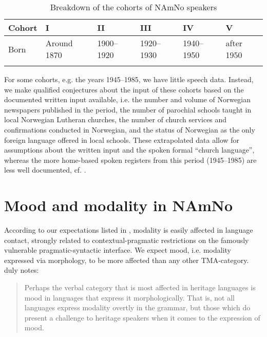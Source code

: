 \documentclass[output=paper]{langscibook}
\begin{document}
\begin{table}[h]
\caption{Breakdown of the cohorts of NAmNo speakers \citep{EideHjelde2023}}
\label{tab:eide:cohorts_short}
\begin{tabularx}{\textwidth}{l *5{Q}}
\lsptoprule
Cohort & I & II & III & IV & V\\\midrule
Born & Around 1870 & 1900--1920 & 1920--1930 & 1940--1950 & after 1950\\
\lspbottomrule
\end{tabularx}
\end{table}


For some cohorts, e.g. the years 1945--1985, we have little speech data. Instead, we make qualified conjectures about the input of these cohorts based on the documented written input available, i.e. the number and volume of Norwegian newspapers published in the period, the number of parochial schools taught in local Norwegian Lutheran churches, the number of church services and confirmations conducted in Norwegian, and the status of Norwegian as the only foreign language offered in local schools. These extrapolated data allow for assumptions about the written input and the spoken formal “church language”, whereas the more home-based spoken registers from this period (1945--1985) are less well documented, cf. \citet{EideHjelde2023}.  

\section{Mood and modality in NAmNo}\label{sec:eide:3}

According to our expectations listed in , modality is easily affected in language contact, strongly related to contextual-pragmatic restrictions on the famously vulnerable pragmatic-syntactic interface. We expect mood, i.e. modality expressed via morphology, to be more affected than any other TMA-category. \citet[54]{Montrul2016} duly notes: 

\begin{quote}
Perhaps the verbal category that is most affected in heritage languages is mood in languages that express it morphologically. That is, not all languages express modality overtly in the grammar, but those which do present a challenge to heritage speakers when it comes to the expression of mood.
\end{quote}
\end{document}
